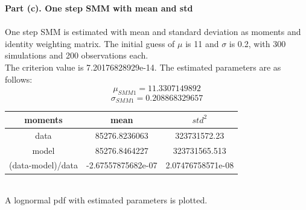 \documentclass[letterpaper,12pt]{article}
\theoremstyle{definition}
\begin{document}
\clearpage

\noindent\textbf{Part (c). One step SMM with mean and std} \\
\\
One step SMM is estimated with mean and standard deviation as moments and identity weighting matrix. The initial guess of $\mu$ is 11 and $\sigma$ is 0.2, with 300 simulations and 200 observations each.\\
The criterion value is 7.20176828929e-14. The estimated parameters are as follows:
\[\mu_{SMM1}= 11.3307149892\]
\[\sigma_{SMM1}= 0.208868329657\]

\begin{center}
\begin{tabular}{ c|c|c }
 moments & mean & $std^2$ \\
 \hline
 data & 85276.8236063 & 323731572.23 \\
 model & 85276.8464227 & 323731565.513 \\
 (data-model)/data & -2.67557875682e-07 & 2.07476758571e-08
\end{tabular}
\end{center}
\\

A lognormal pdf with estimated parameters is plotted. \\

\begin{figure}[htb]\centering\captionsetup{width=6.0in}
  \caption{\textbf{}}
\end{figure} \\
\end{document}
